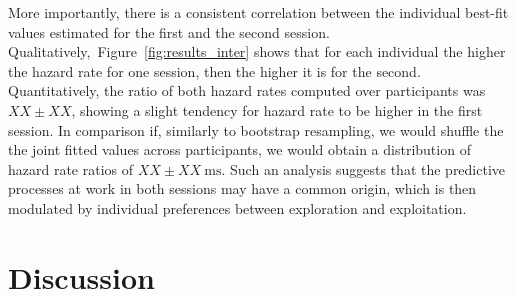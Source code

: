 \documentclass[12pt,english]{article}%
\newcommand{\ms}{\si{\milli\second}}%
\newcommand{\citep}[1]{\parencite{#1}}
\newcommand{\seeFig}[1]{Figure~\ref{fig:#1}}
\newcommand{\AM}[1]{\textbf{\textcolor{blue}{[AM: #1]}}}
\begin{document}
More importantly, there is a  consistent
correlation between the individual best-fit values estimated for the first and the second session.
Qualitatively,~\seeFig{results_inter} shows that for each individual the higher the hazard rate for one session, then the higher it is for the second.
Quantitatively, the ratio of both hazard rates computed over participants was $XX \pm XX$,
showing a slight tendency for hazard rate to be higher in the first session.
In comparison if, similarly to bootstrap resampling, 
we would shuffle the the joint fitted values across participants,
we would obtain a distribution of hazard rate ratios of $XX \pm XX~\ms$.
Such an analysis suggests that the predictive processes
at work in both sessions may have a common origin,
which is then modulated by individual preferences 
between exploration and exploitation.
\section{Discussion}
\label{sec:outro}

\end{document}
